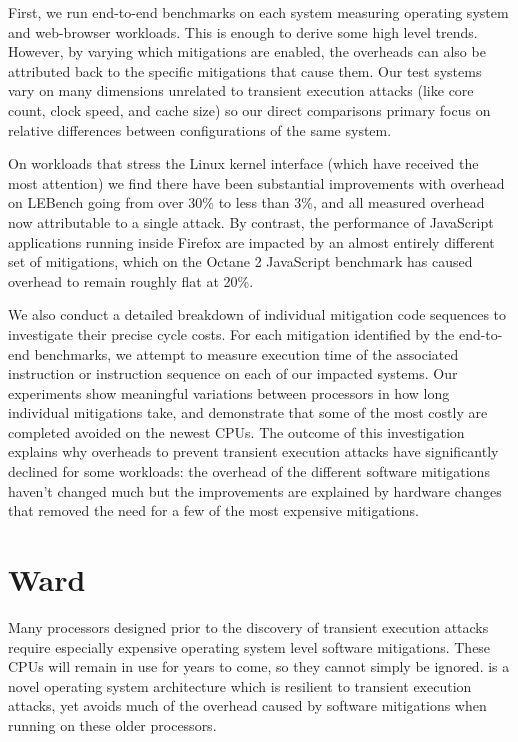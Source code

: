 
First, we run end-to-end benchmarks on each system measuring operating system and web-browser workloads.
This is enough to derive some high level trends.
However, by varying which mitigations are enabled, the overheads can also be attributed back to the specific mitigations that cause them.
Our test systems vary on many dimensions unrelated to transient execution attacks (like core count, clock speed, and cache size) so our direct comparisons primary focus on relative differences between configurations of the same system.

On workloads that stress the Linux kernel interface (which have received the most attention) we find there have been substantial improvements with overhead on LEBench going from over 30\% to less than 3\%, and all measured overhead now attributable to a single attack.
By contrast, the performance of JavaScript applications running inside Firefox are impacted by an almost entirely different set of mitigations, which on the Octane 2 JavaScript benchmark has caused overhead to remain roughly flat at 20\%. 

We also conduct a detailed breakdown of individual mitigation code sequences to investigate their precise cycle costs.
For each mitigation identified by the end-to-end benchmarks, we attempt to measure execution time of the associated instruction or instruction sequence on each of our impacted systems.
Our experiments show meaningful variations between processors in how long individual mitigations take, and demonstrate that some of the most costly are completed avoided on the newest CPUs. 
The outcome of this investigation explains why overheads to prevent transient execution attacks have significantly declined for some workloads: the overhead of the different software mitigations haven't changed much but the improvements are explained by hardware changes that removed the need for a few of the most expensive mitigations.

\section{Ward}
Many processors designed prior to the discovery of transient execution attacks require especially expensive operating system level software mitigations.
These CPUs will remain in use for years to come, so they cannot simply be ignored.
\sys is a novel operating system architecture which is resilient to transient execution attacks, yet avoids much of the overhead caused by software mitigations when running on these older processors. 

